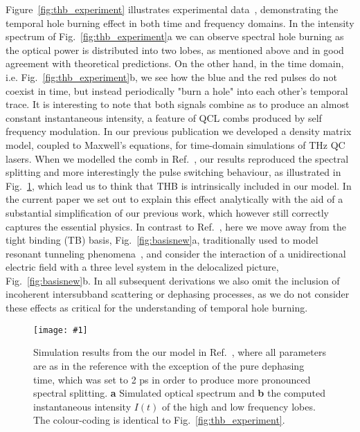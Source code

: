 \documentclass[onecolumn,secnumarabic,amssymb, nobibnotes, aip, prd]{revtex4-1}
\newcommand{\includegraphicsXL}[1]{\texttt{[image: \#1]}}
\begin{document}
Figure~\ref{fig:thb_experiment} illustrates experimental data~\cite{burghoff2015evaluating}, demonstrating the temporal hole burning effect in both time and frequency domains. In the intensity spectrum of Fig.~\ref{fig:thb_experiment}a we can observe spectral hole burning as the optical power is distributed into two lobes, as mentioned above and in good agreement with theoretical predictions. On the other hand, in the time domain, i.e. Fig.~\ref{fig:thb_experiment}b, we see how the blue and the red pulses do not coexist in time, but instead periodically "burn a hole" into each other's temporal trace. It is interesting to note that both signals combine as to produce an almost constant instantaneous intensity, a feature of QCL combs produced by self frequency modulation\cite{khurgin2014coherent}. In our previous publication \cite{petz2016} we developed a density matrix model, coupled to Maxwell's equations, for time-domain simulations of THz QC lasers. When we modelled the comb in Ref.~, our results reproduced the spectral splitting and more interestingly the pulse switching behaviour, as illustrated in Fig.~\ref{fig:thb_simulation}, which lead us to think that THB is intrinsically included in our model. In the current paper we set out to explain this effect analytically with the aid of a substantial simplification of our previous work, which however still correctly captures the essential physics. In contrast to Ref.~, here we move away from the tight binding (TB) basis, Fig.~\ref{fig:basisnew}a, traditionally used to model resonant tunneling phenomena~\cite{callebaut2005importance}, and consider the interaction of a unidirectional electric field with a three level system in the delocalized picture, Fig.~\ref{fig:basisnew}b. In all subsequent derivations we also omit the inclusion of incoherent intersubband scattering or dephasing processes, as we do not consider these effects as critical for the understanding of temporal hole burning. 
\begin{figure}[h!]
	\begin{center}
		\includegraphicsXL{IMGS/sim_10p8_small2.eps}
		\caption{Simulation results from the our model in Ref.~, where all parameters are as in the reference with the exception of the pure dephasing time, which was set to 2 ps in order to produce more pronounced spectral splitting. \textbf{a} Simulated optical spectrum and \textbf{b} the computed instantaneous intensity $I(t)$ of the high and low frequency lobes. The colour-coding is identical to Fig.~\ref{fig:thb_experiment}.}\label{fig:thb_simulation}
	\end{center}	
\end{figure}
\end{document}
